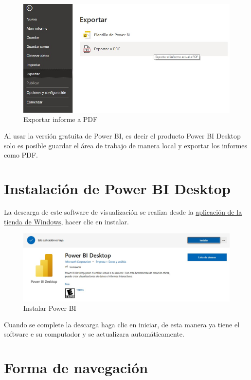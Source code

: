 \documentclass[
]{book}
\begin{document}
\begin{figure}

{\centering \includegraphics[width=0.6\linewidth]{Imágenes/powerbi3} 

}

\caption{Exportar informe a PDF}\label{fig:exportarinforme-fig}
\end{figure}

Al usar la versión gratuita de Power BI, es decir el producto Power BI Desktop solo es posible guardar el área de trabajo de manera local y exportar los informes como PDF.

\hypertarget{instalaciuxf3n-de-power-bi-desktop}{%
\section{Instalación de Power BI Desktop}\label{instalaciuxf3n-de-power-bi-desktop}}

La descarga de este software de visualización se realiza desde la \href{https://aka.ms/pbidesktopstore}{aplicación de la tienda de Windows}, hacer clic en instalar.

\begin{figure}

{\centering \includegraphics[width=0.6\linewidth]{Imágenes/powerbi4} 

}

\caption{Instalar Power BI}\label{fig:instalacionpowerbi-fig}
\end{figure}

Cuando se complete la descarga haga clic en iniciar, de esta manera ya tiene el software e su computador y se actualizara automáticamente.

\hypertarget{formadenavegacionpower}{%
\section{Forma de navegación}\label{formadenavegacionpower}}
\end{document}
